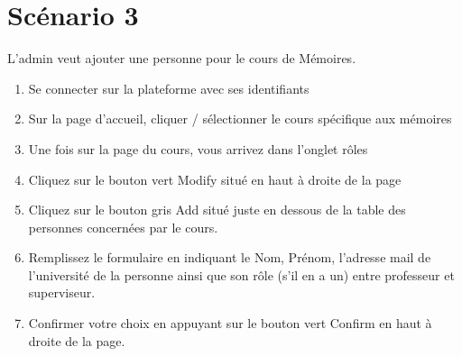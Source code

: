 \documentclass[a4paper, 11pt]{article}
\begin{document}
\section*{Scénario 3}
L'admin veut ajouter une personne pour le cours de Mémoires.

\begin{tcolorbox}
    \begin{enumerate}
        \item Se connecter sur la plateforme avec ses identifiants
        \item Sur la page d'accueil, cliquer / sélectionner le cours spécifique aux mémoires
        \item Une fois sur la page du cours, vous arrivez dans l'onglet rôles
        \item Cliquez sur le bouton vert \og Modify\fg{} situé en haut à droite de la page
        \item Cliquez sur le bouton gris \og Add\fg{} situé juste en dessous de la table des personnes concernées par le cours.
        \item Remplissez le formulaire en indiquant le Nom, Prénom, l'adresse mail de l'université de la personne ainsi que son rôle (s'il en a un) entre professeur et superviseur.
        \item Confirmer votre choix en appuyant sur le bouton vert \og Confirm\fg{} en haut à droite de la page.
    \end{enumerate}
\end{tcolorbox}
\end{document}
